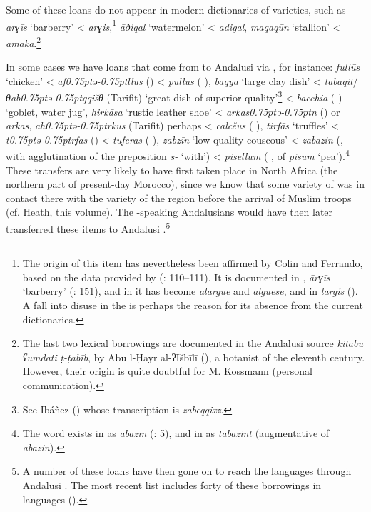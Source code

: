 \documentclass[output=paper,modfonts,nonflat]{langsci/langscibook}
\begin{document}
Some of these loans do not appear in modern dictionaries of  varieties, such as \textit{arɣīs} ‘barberry’ < \textit{arɣis},\footnote{The  origin of this item has nevertheless been affirmed by Colin and Ferrando, based on the data provided by  (\citealt{Ferrando1997}: 110–111). It is documented in  , \textit{ārɣīs} ‘barberry’ (\citealt{Prémare1995}: 151), and in  it has become \textit{alargue} and \textit{alguese}, and in  \textit{largis} (\citealt{CorrientePereiraVicenteforthcoming}). A fall into disuse in the  is perhaps the reason for its absence from the current dictionaries.} \textit{āðiqal} ‘watermelon’ < \textit{adigal}, \textit{maqaqūn} ‘stallion’ < \textit{amaka}.\footnote{The last two lexical borrowings are documented in the Andalusi source \textit{kitābu} \textit{ʕumdati} \textit{ṭ-ṭabīb}, by Abu l-Ḫayr al-ʔIšbīlī (\citeyear{Abūl-Ḫayral-Išbīlī2004,Abūl-Ḫayral-Išbīlī2007}), a botanist of the eleventh century. However, their  origin is quite doubtful for M. Kossmann (personal communication).} 

In some cases we have loans that come from   to Andalusi  via , for instance: \textit{fullūs} ‘chicken’ < \textit{af\kern 0.75ptǝ\kern -0.75ptllus} () < \textit{pullus} ( ), \textit{bāqya} ‘large clay dish’ < \textit{tabaqit}/\textit{θab\kern 0.75ptǝ\kern -0.75ptqqišθ} (Tarifit) ‘great dish of superior quality’\footnote{See Ibáñez (\citeyear[272]{Ibáñez1949}) whose transcription is \textit{zabeqqixz}.} < \textit{bacchia} ( ) ‘goblet, water jug’, \textit{hirkāsa} ‘rustic leather shoe’ < \textit{arkas\kern 0.75ptǝ\kern -0.75ptn} () or \textit{arkas}, \textit{ah\kern 0.75ptǝ\kern -0.75ptrkus} (Tarifit) perhaps < \textit{calcĕus} ( ), \textit{tirfās} ‘truffles’ < \textit{t\kern 0.75ptǝ\kern -0.75ptrfas} () < \textit{tuferas} ( ), \textit{zabzīn} ‘low-quality couscous’ < \textit{zabazin} (, {with  agglutination of the preposition} \textit{s-} ‘with’) < \textit{pisellum} ( ,  of \textit{pisum} ‘pea’).\footnote{The word exists in   as \textit{ābāzīn} (\citealt{Prémare1993}: 5), and in   as \textit{tabazint} (augmentative of \textit{abazin}).}  These transfers are very likely to have first taken place in North Africa (the northern part of present-day Morocco), since we know that some variety of   was in contact there with the  variety of the region before the arrival of Muslim troops (cf. Heath, this volume). The -speaking Andalusians would have then later transferred these items to Andalusi .\footnote{A number of these  loans have then gone on to reach the  languages through Andalusi . The most recent list includes forty of these borrowings in  languages (\citealt{CorrientePereiraVicente2019}).}  
\end{document}
